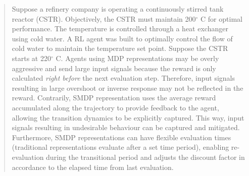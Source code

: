 \begin{quote}
    Suppose a refinery company is operating a continuously stirred tank reactor (CSTR). Objectively, the CSTR must maintain 200$^{\circ}$ C for optimal performance.  The temperature is controlled through a heat exchanger using cold water.  A RL agent was built to optimally control the flow of cold water to maintain the temperature set point. Suppose the CSTR starts at 220$^{\circ}$ C.  Agents using MDP representations may be overly aggressive and send large input signals because the reward is only calculated \textit{right before} the next evaluation step. Therefore, input signals resulting in large overshoot or inverse response may not be reflected in the reward. Contrarily, SMDP representation uses the average reward accumulated along the trajectory to provide feedback to the agent, allowing the transition dynamics to be explicitly captured. This way, input signals resulting in undesirable behaviour can be captured and mitigated. Furthermore, SMDP representations can have flexible evaluation times (traditional representations evaluate after a set time period), enabling re-evaluation during the transitional period and adjusts the discount factor in accordance to the elapsed time from last evaluation.
\end{quote}









